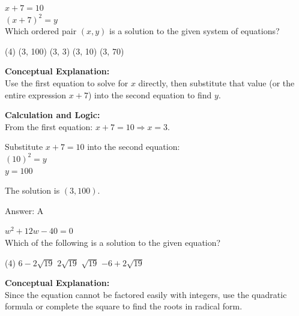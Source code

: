 \documentclass[11pt,paper=a4,answers]{exam}
\begin{document}
\begin{questions}
\vspace{40pt}

\question
$x + 7 = 10$ \\
$(x + 7)^2 = y$ \\
Which ordered pair $(x, y)$ is a solution to the given system of equations?
\begin{tasks}(4)
    \task (3, 100)
    \task (3, 3)
    \task (3, 10)
    \task (3, 70)
\end{tasks}

\begin{solution}
\textbf{Conceptual Explanation:} \\
Use the first equation to solve for $x$ directly, then substitute that value (or the entire expression $x+7$) into the second equation to find $y$.

\vspace{20pt}

\textbf{Calculation and Logic:} \\
From the first equation: $x + 7 = 10 \Rightarrow x = 3$.

\vspace{10pt}

Substitute $x+7 = 10$ into the second equation: \\
$(10)^2 = y$ \\
$y = 100$

\vspace{10pt}

The solution is $(3, 100)$.

\vspace{25pt}

Answer: \colorbox{yellow!100}{A}
\end{solution}

\vspace{40pt}

\question
$w^2 + 12w - 40 = 0$ \\
Which of the following is a solution to the given equation?
\begin{tasks}(4)
    \task $6 - 2\sqrt{19}$
    \task $2\sqrt{19}$
    \task $\sqrt{19}$
    \task $-6 + 2\sqrt{19}$
\end{tasks}

\begin{solution}
\textbf{Conceptual Explanation:} \\
Since the equation cannot be factored easily with integers, use the quadratic formula or complete the square to find the roots in radical form.


\end{solution}
\end{questions}
\end{document}
